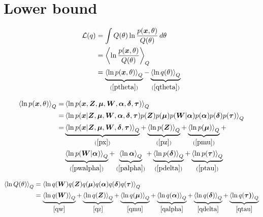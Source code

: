 \documentclass[10pt]{article}
\newcommand{\Angle}[1]{\left \langle #1 \right \rangle}
\newcommand{\Eq}[1]{\Angle{#1}_Q}
\begin{document}
\section{Lower bound}
    \begin{align}
        \mathcal{L}(q)&=\int Q(\theta) \ln{\frac{p(\bm{x},\theta)}{Q(\theta)}} \, d\theta \nonumber \\
        &=\Eq{\ln{\frac{p(\bm{x},\theta)}{Q(\theta)}}} \nonumber \\
        &=\underbrace{\Eq{\ln{p(\bm{x},\theta)}}}_{(\ref{ptheta})} - \underbrace{\Eq{\ln{q(\theta)}}}_{(\ref{qtheta})}
    \end{align}

    \begin{align}
        \Eq{\ln{p(\bm{x},\theta)}}=&\Eq{\ln{p(\bm{x},\bm{Z},\bm{\mu},\bm{W},\bm{\alpha},\bm{\delta},\bm{\tau})}} \nonumber \\
        =&\Eq{\ln{p(\bm{x}|\bm{Z},\bm{\mu},\bm{W},\bm{\alpha},\bm{\delta},\bm{\tau})p(\bm{Z})p(\bm{\mu})p(\bm{W} | \bm{\alpha})p(\bm{\alpha})p(\bm{\delta})p(\bm{\tau})}}\nonumber \\
        =&\underbrace{\Eq{\ln{p(\bm{x}|\bm{Z},\bm{\mu},\bm{W},\bm{\delta},\bm{\tau})}}}_{(\ref{px})}+\underbrace{\Eq{\ln{p(\bm{Z})}}}_{(\ref{pz})}+\underbrace{\Eq{\ln{p(\bm{\mu})}}}_{(\ref{pmu})}+ \nonumber \\
        & \underbrace{\Eq{\ln{p(\bm{W}| \bm{\alpha})}}}_{(\ref{pwalpha})} + \underbrace{\Eq{\ln{\bm{\alpha}}}}_{(\ref{palpha})}+\underbrace{\Eq{\ln{p(\bm{\delta})}}}_{(\ref{pdelta})}+\underbrace{\Eq{\ln{p(\bm{\tau})}}}_{(\ref{ptau})}
        \label{ptheta}
    \end{align}

    \begin{align}
        \Eq{\ln{Q(\theta)}} &= \Eq{\ln{q(\bm{W})q(\bm{Z})q(\bm{\mu})q(\bm{\alpha})q(\bm{\delta})q(\bm{\tau})}} \nonumber \\
        &=\underbrace{\Eq{\ln{q(\bm{W})}}}_{\ref{qw}} + \underbrace{\Eq{\ln{q(\bm{Z})}}}_{\ref{qz}} + \underbrace{\Eq{\ln{q(\bm{\mu})}}}_{\ref{qmu}} + \underbrace{\Eq{\ln{q(\bm{\alpha})}}}_{\ref{qalpha}} + \underbrace{\Eq{\ln{q(\bm{\delta})}}}_{\ref{qdelta}} + \underbrace{\Eq{\ln{q(\bm{\tau)}}}}_{\ref{qtau}}
        \label{qtheta}
    \end{align}
\end{document}

